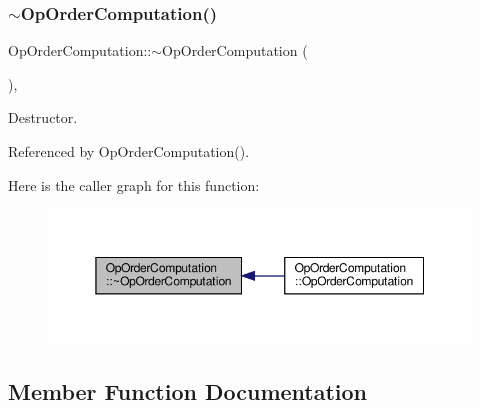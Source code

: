 \subsubsection{\texorpdfstring{$\sim$\+Op\+Order\+Computation()}{~OpOrderComputation()}}
{\footnotesize\ttfamily Op\+Order\+Computation\+::$\sim$\+Op\+Order\+Computation (\begin{DoxyParamCaption}{ }\end{DoxyParamCaption})\hspace{0.3cm}{\ttfamily [override]}, {\ttfamily [default]}}



Destructor. 



Referenced by Op\+Order\+Computation().

Here is the caller graph for this function\+:
\nopagebreak
\begin{figure}[H]
\begin{center}
\leavevmode
\includegraphics[width=350pt]{d2/d8a/classOpOrderComputation_a687f897e757aeb13b59458bf3460dd73_icgraph}
\end{center}
\end{figure}


\subsection{Member Function Documentation}
\mbox{\label{classOpOrderComputation_ab2d87d9aeb8f52a0f96f421d1839fb5b}} 
